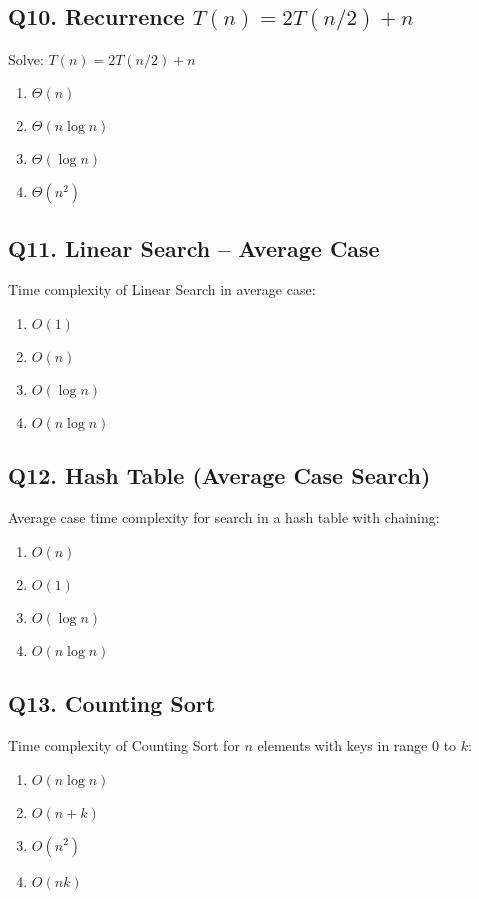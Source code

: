 \subsection*{Q10. Recurrence \(T(n) = 2T(n/2) + n\)}
Solve: \(T(n) = 2T(n/2) + n\)

\begin{enumerate}[label=(\alph*)]
    \item \(\Theta(n)\) \quad
    \item \(\Theta(n \log n)\) \quad
    \item \(\Theta(\log n)\) \quad
    \item \(\Theta(n^2)\)
\end{enumerate}


\subsection*{Q11. Linear Search – Average Case}
Time complexity of Linear Search in average case:

\begin{enumerate}[label=(\alph*)]
    \item \(O(1)\) \quad
    \item \(O(n)\) \quad
    \item \(O(\log n)\) \quad
    \item \(O(n \log n)\)
\end{enumerate}


\subsection*{Q12. Hash Table (Average Case Search)}
Average case time complexity for search in a hash table with chaining:

\begin{enumerate}[label=(\alph*)]
    \item \(O(n)\) \quad
    \item \(O(1)\) \quad
    \item \(O(\log n)\) \quad
    \item \(O(n \log n)\)
\end{enumerate}


\subsection*{Q13. Counting Sort}
Time complexity of Counting Sort for \(n\) elements with keys in range \(0\) to \(k\):

\begin{enumerate}[label=(\alph*)]
    \item \(O(n \log n)\) \quad
    \item \(O(n + k)\) \quad
    \item \(O(n^2)\) \quad
    \item \(O(nk)\)
\end{enumerate}


